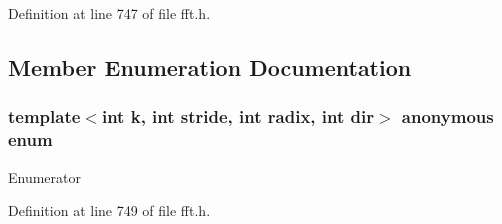Definition at line 747 of file fft.\+h.



\subsection{Member Enumeration Documentation}
\subsubsection[{\texorpdfstring{anonymous enum}{anonymous enum}}]{\setlength{\rightskip}{0pt plus 5cm}template$<$int k, int stride, int radix, int dir$>$ anonymous enum}\hypertarget{class__sbsms___1_1__fft_ac988bcf7cd717245caa9a824697ca8bc}{}\label{class__sbsms___1_1__fft_ac988bcf7cd717245caa9a824697ca8bc}
\begin{Desc}
\item[Enumerator]\par
\begin{description}
\item[{\em 
N\hypertarget{class__sbsms___1_1__fft_ac988bcf7cd717245caa9a824697ca8bca7a430ddde1867a675c1f992190238ecf}{}\label{class__sbsms___1_1__fft_ac988bcf7cd717245caa9a824697ca8bca7a430ddde1867a675c1f992190238ecf}
}]\item[{\em 
\+\_\+radix\hypertarget{class__sbsms___1_1__fft_ac988bcf7cd717245caa9a824697ca8bca8e946292315522014b41873dd734511e}{}\label{class__sbsms___1_1__fft_ac988bcf7cd717245caa9a824697ca8bca8e946292315522014b41873dd734511e}
}]\item[{\em 
\+\_\+stride\hypertarget{class__sbsms___1_1__fft_ac988bcf7cd717245caa9a824697ca8bca9378fa5d6bae901122e2b9d4b6129f40}{}\label{class__sbsms___1_1__fft_ac988bcf7cd717245caa9a824697ca8bca9378fa5d6bae901122e2b9d4b6129f40}
}]\end{description}
\end{Desc}


Definition at line 749 of file fft.\+h.



